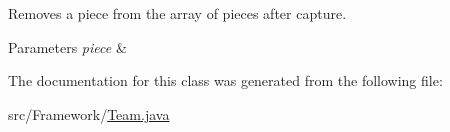 Removes a piece from the array of pieces after capture. 
\begin{DoxyParams}{Parameters}
{\em piece} & \\
\hline
\end{DoxyParams}


The documentation for this class was generated from the following file\+:\begin{DoxyCompactItemize}
\item 
src/\+Framework/\hyperlink{_team_8java}{Team.\+java}\end{DoxyCompactItemize}
